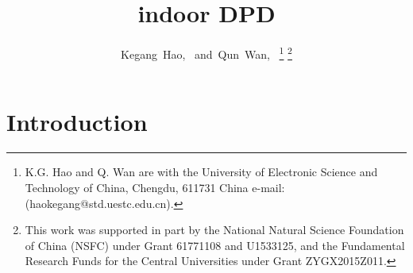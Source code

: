\documentclass[journal]{IEEEtran}
\begin{document}
\title{indoor DPD}

\author{Kegang~Hao,~
        and~Qun~Wan,~%
\thanks{K.G. Hao and Q. Wan are with the University of Electronic Science and Technology of China, Chengdu, 611731 China e-mail: (haokegang@std.uestc.edu.cn).}%
\thanks{This work was supported in part by the National Natural Science Foundation of China (NSFC) under Grant 61771108 and U1533125, and the Fundamental Research Funds for the Central Universities under Grant ZYGX2015Z011.}
}

\maketitle

\begin{abstract}


\end{abstract}

\begin{IEEEkeywords}


\end{IEEEkeywords}


\IEEEpeerreviewmaketitle


\section{Introduction}
\label{sec:intro}
 \cite{Amar2004Direct} 
\end{document}
